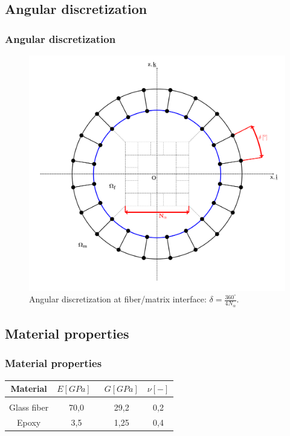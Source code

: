 \documentclass[first,firstsupp,lastsupp,handout,last,hyperref,table]{ETHclass}
\begin{document}
\subsection{Angular discretization}

\begin{frame}
\frametitle{Angular discretization}
\vspace{-0.7cm}
\centering
\captionsetup[figure]{font=scriptsize,labelfont=scriptsize}
\begin{figure}[!h]
\centering
\includegraphics[height=0.7\textheight]{mesh-disc-at-interface.pdf}
  \caption{\scriptsize Angular discretization at fiber/matrix interface: $\delta=\frac{360^{\circ}}{4N_{\alpha}}$.}
  \label{fig:angu-discr-def}
\end{figure}
\end{frame}

\subsection{Material properties}

\begin{frame}
\frametitle{Material properties}
\vspace{-0.7cm}
\footnotesize
\centering
\captionsetup[figure]{font=scriptsize,labelfont=scriptsize}
\begin{table}[htbp]

  \centering
    \begin{tabular}{cccc}

    \textbf{Material} & \textbf{$E\left[GPa\right]$}\ & \textbf{$G\left[GPa\right]$} & \textbf{$\nu\left[-\right]$} \\[3pt]
    \midrule\\[12pt]
    Glass fiber    & 70,0  & 29,2   & 0,2  \\[16pt]
    Epoxy    & 3,5    & 1,25   & 0,4  

    \end{tabular}%
  \label{tab:phaseprop}%
\end{table}%
\end{frame}
\end{document}
